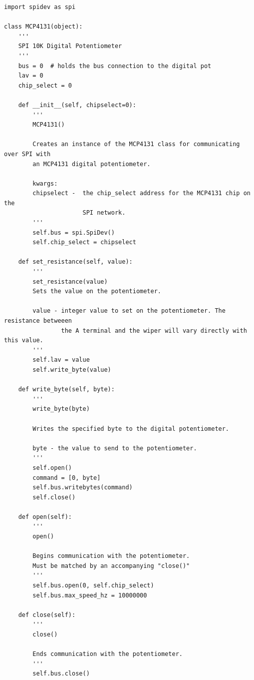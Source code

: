 \documentclass[twoside,a4]{report}
\begin{document}
\begin{Verbatim}[frame=single,fontsize=\footnotesize]
import spidev as spi

class MCP4131(object):
	'''
	SPI 10K Digital Potentiometer
	'''
	bus = 0  # holds the bus connection to the digital pot
	lav = 0
	chip_select = 0
	
	def __init__(self, chipselect=0):
		'''
		MCP4131()
		
		Creates an instance of the MCP4131 class for communicating over SPI with
		an MCP4131 digital potentiometer.
		
		kwargs:
		chipselect -  the chip_select address for the MCP4131 chip on the 
		              SPI network.
		'''
		self.bus = spi.SpiDev()
		self.chip_select = chipselect
	
	def set_resistance(self, value):
		'''
		set_resistance(value)
		Sets the value on the potentiometer.
		
		value - integer value to set on the potentiometer. The resistance betweeen 
		        the A terminal and the wiper will vary directly with this value.
		'''
		self.lav = value
		self.write_byte(value)
	
	def write_byte(self, byte):
		'''
		write_byte(byte)
		
		Writes the specified byte to the digital potentiometer.
		
		byte - the value to send to the potentiometer.
		'''
		self.open()
		command = [0, byte]
		self.bus.writebytes(command)
		self.close()
	
	def open(self):
		'''
		open()
		
		Begins communication with the potentiometer.
		Must be matched by an accompanying "close()"
		'''
		self.bus.open(0, self.chip_select)
		self.bus.max_speed_hz = 10000000
	
	def close(self):
		'''
		close()
		
		Ends communication with the potentiometer.
		'''
		self.bus.close()
\end{Verbatim}
\end{document}
